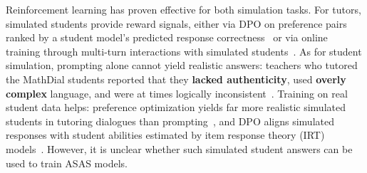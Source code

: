 Reinforcement learning has proven effective for both simulation tasks.
For tutors, simulated students provide reward signals, either via DPO on preference pairs ranked by a student model's predicted response correctness~\citep{scarlatosTrainingLLMbasedTutors2025} or via online training through multi-turn interactions with simulated students~\citep{dinucu-jianuProblemSolvingTeachingProblemSolving2025}.
As for student simulation, prompting alone cannot yield realistic answers: teachers who tutored the MathDial students reported that they \textbf{lacked authenticity}, used \textbf{overly complex} language, and were at times logically inconsistent~\citep{martynovaCanLLMsEffectively2025}.
Training on real student data helps: preference optimization yields far more realistic simulated students in tutoring dialogues than prompting~\citep{scarlatosSimulatedStudentsTutoring2026}, and DPO aligns simulated responses with student abilities estimated by item response theory (IRT) models~\citep{scarlatosSMARTSimulatedStudents2025}.
However, it is unclear whether such simulated student answers can be used to train ASAS models.
